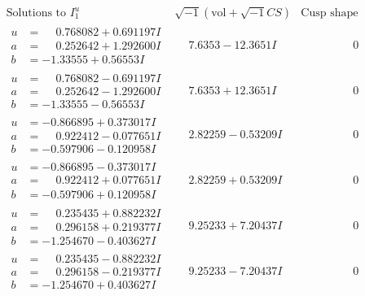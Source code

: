 \documentclass[1p]{elsarticle_modified}
\theoremstyle{definition}
\newcommand{\I}{\sqrt{-1}}
\begin{document}
$$\begin{array}{c|c|c}  
\text{Solutions to }I^u_{1}& \I (\text{vol} + \sqrt{-1}CS) & \text{Cusp shape}\\
 \hline 
\begin{aligned}
u &= \phantom{-}0.768082 + 0.691197 I \\
a &= \phantom{-}0.252642 + 1.292600 I \\
b &= -1.33555 + 0.56553 I\end{aligned}
 & \phantom{-}7.6353 - 12.3651 I & \phantom{-0.000000 } 0 \\ \hline\begin{aligned}
u &= \phantom{-}0.768082 - 0.691197 I \\
a &= \phantom{-}0.252642 - 1.292600 I \\
b &= -1.33555 - 0.56553 I\end{aligned}
 & \phantom{-}7.6353 + 12.3651 I & \phantom{-0.000000 } 0 \\ \hline\begin{aligned}
u &= -0.866895 + 0.373017 I \\
a &= \phantom{-}0.922412 - 0.077651 I \\
b &= -0.597906 - 0.120958 I\end{aligned}
 & \phantom{-}2.82259 - 0.53209 I & \phantom{-0.000000 } 0 \\ \hline\begin{aligned}
u &= -0.866895 - 0.373017 I \\
a &= \phantom{-}0.922412 + 0.077651 I \\
b &= -0.597906 + 0.120958 I\end{aligned}
 & \phantom{-}2.82259 + 0.53209 I & \phantom{-0.000000 } 0 \\ \hline\begin{aligned}
u &= \phantom{-}0.235435 + 0.882232 I \\
a &= \phantom{-}0.296158 + 0.219377 I \\
b &= -1.254670 - 0.403627 I\end{aligned}
 & \phantom{-}9.25233 + 7.20437 I & \phantom{-0.000000 } 0 \\ \hline\begin{aligned}
u &= \phantom{-}0.235435 - 0.882232 I \\
a &= \phantom{-}0.296158 - 0.219377 I \\
b &= -1.254670 + 0.403627 I\end{aligned}
 & \phantom{-}9.25233 - 7.20437 I & \phantom{-0.000000 } 0 \\ \hline\begin{aligned}

\end{aligned}
\end{array}$$
\end{document}
